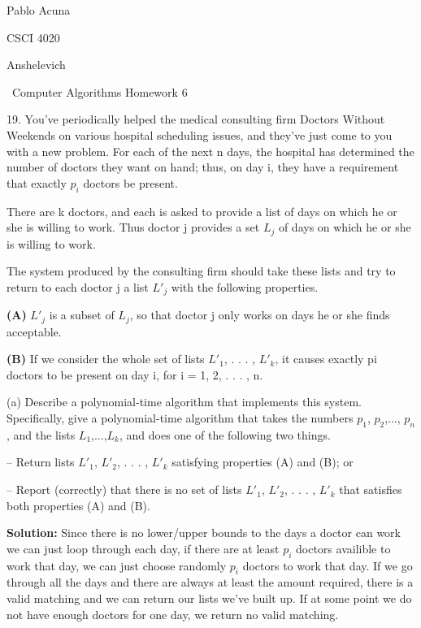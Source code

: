 \documentclass{article}
\begin{document}
Pablo Acuna

CSCI 4020

Anshelevich

{\centering\ Computer Algorithms Homework 6 \par}

19. You’ve periodically helped the medical consulting firm Doctors Without
Weekends on various hospital scheduling issues, and they’ve just come to you with
a new problem. For each of the next n days, the hospital has determined the number
of doctors they want on hand; thus, on day i, they have a requirement that
exactly $p_i$ doctors be present.

There are k doctors, and each is asked to provide a list of days on which he or
she is willing to work. Thus doctor j provides a set $L_j$ of days on which he or
she is willing to work.

The system produced by the consulting firm should take these lists and try to
return to each doctor j a list $L'_j$ with the following properties.

\textbf{(A)} $L'_j$ is a subset of $L_j$, so that doctor j only works on days
he or she finds acceptable.

\textbf{(B)} If we consider the whole set of lists $L'_1$, . . . , $L'_k$, it
causes exactly pi doctors to be present on day i, for i = 1, 2, . . . , n. \newline

(a) Describe a polynomial-time algorithm that implements this system.
Specifically, give a polynomial-time algorithm that takes the numbers
$p_1$, $p_2$,..., $p_n$, and the lists $L_1$,...,$L_k$, and does one of the
following two things.

– Return lists $L'_1$, $L'_2$, . . . , $L'_k$ satisfying properties (A) and (B); or

– Report (correctly) that there is no set of lists $L'_1$, $L'_2$, . . . , $L'_k$ that
satisfies both properties (A) and (B). \newline

\textbf{Solution:} Since there is no lower/upper bounds to the days a doctor
can work we can just loop through each day, if there are at least $p_i$ doctors
availible to work that day, we can just choose randomly $p_i$ doctors to work that day.
If we go through all the days and there are always at least the amount required, there
is a valid matching and we can return our lists we've built up.  If at some point
we do not have enough doctors for one day, we return no valid matching. \newline
\end{document}
